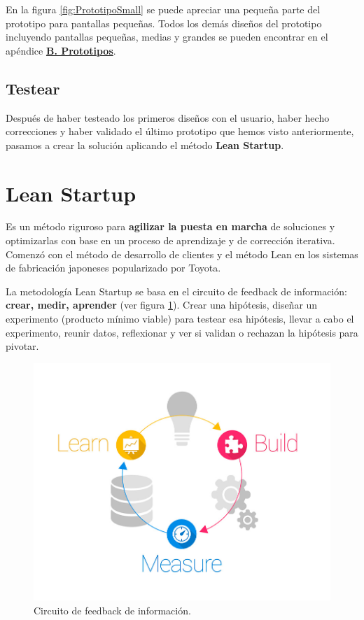 \documentclass[12pt,twoside,titlepage]{report}
\begin{document}
En la figura \ref{fig:PrototipoSmall} se puede apreciar una pequeña parte del prototipo para pantallas pequeñas. Todos los demás diseños del prototipo incluyendo pantallas pequeñas, medias y grandes se pueden encontrar en el apéndice \hyperref[sec:Prototipos]{\textbf{B. Prototipos}}.

\subsection{Testear}
\label{sec:testear}

Después de haber testeado los primeros diseños con el usuario, haber hecho correcciones y haber validado el último prototipo que hemos visto anteriormente, pasamos a crear la solución aplicando el método \textbf{Lean Startup}.

\section{Lean Startup}
\label{sec:lean}

Es un método riguroso para \textbf{agilizar la puesta en marcha} de soluciones y optimizarlas con base en un proceso de aprendizaje y de corrección iterativa. Comenzó con el método de desarrollo de clientes y el método Lean en los sistemas de fabricación japoneses popularizado por Toyota.

La metodología Lean Startup se basa en el circuito de feedback de información: \textbf{crear, medir, aprender} (ver figura \ref{fig:LeanStartup}). Crear una hipótesis, diseñar un experimento (producto mínimo viable) para testear esa hipótesis, llevar a cabo el experimento, reunir datos, reflexionar y ver si validan o rechazan la hipótesis para pivotar.
\cite{leanstartup1}

\begin{figure}[H]
    \centering
    \includegraphics[scale=0.3]{Lean Startup/CircuitoFeedback}
    \caption{Circuito de feedback de información.}
    \label{fig:LeanStartup}
\end{figure}
\end{document}
